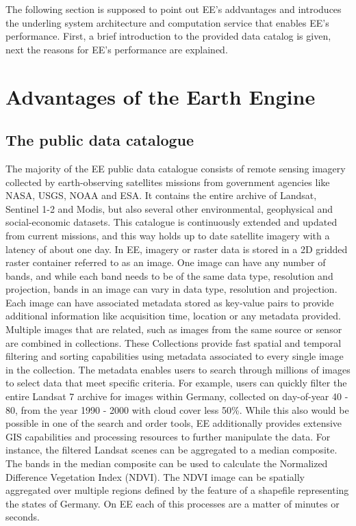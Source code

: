 The following section is supposed to point out EE's addvantages and introduces the underling system architecture and computation service that enables EE's performance. First, a brief introduction to the provided data catalog is given, next the reasons for EE's performance are explained.


\section{Advantages of the Earth Engine}

\subsection{The public data catalogue}

The majority of the EE public data catalogue consists of remote sensing imagery collected by earth-observing satellites missions from government agencies like NASA, USGS, NOAA and ESA. It contains the entire archive of Landsat, Sentinel 1-2 and Modis, but also several other environmental, geophysical and social-economic datasets. This catalogue is continuously extended and updated from current missions, and this way holds up to date satellite imagery with a latency of about one day.
In EE, imagery or raster data is stored in a 2D gridded raster container referred to as an image. One image can have any number of bands, and while each band needs to be of the same data type, resolution and projection, bands in an image can vary in data type, resolution and projection. Each image can have associated metadata stored as key-value pairs to provide additional information like acquisition time, location or any metadata provided.
Multiple images that are related, such as images from the same source or sensor are combined in collections. These Collections provide fast spatial and temporal filtering and sorting capabilities using metadata associated to every single image in the collection. The metadata enables users to search through millions of images to select data that meet specific criteria. For example, users can quickly filter the entire Landsat 7 archive for images within Germany, collected on day-of-year 40 - 80, from the year 1990 - 2000 with cloud cover less 50\%. While this also would be possible in one of the search and order tools, EE additionally provides extensive GIS capabilities and processing resources to further manipulate the data.
For instance, the filtered Landsat scenes can be aggregated to a median composite. The bands in the median composite can be used to calculate the Normalized Difference Vegetation Index (NDVI). The NDVI image can be spatially aggregated over multiple regions defined by the feature of a shapefile representing the states of Germany. On EE each of this processes are a matter of minutes or seconds.

